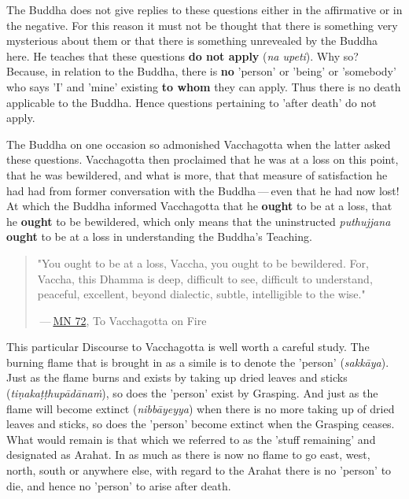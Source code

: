 The Buddha does not give replies to these questions either in the
affirmative or in the negative. For this reason it must not be thought
that there is something very mysterious about them or that there is
something unrevealed by the Buddha here. He teaches that these questions
\textbf{do not apply} (\emph{na upeti}). Why so? Because, in relation to the
Buddha, there is \textbf{no} 'person' or 'being' or 'somebody' who says 'I' and
'mine' existing \textbf{to whom} they can apply. Thus there is no death
applicable to the Buddha. Hence questions pertaining to 'after death' do
not apply.


The Buddha on one occasion so admonished Vacchagotta when the latter
asked these questions. Vacchagotta then proclaimed that he was at a loss
on this point, that he was bewildered, and what is more, that that
measure of satisfaction he had had from former conversation with the
Buddha — even that he had now lost! At which the Buddha informed
Vacchagotta that he \textbf{ought} to be at a loss, that he \textbf{ought} to be
bewildered, which only means that the uninstructed \emph{puthujjana} \textbf{ought}
to be at a loss in understanding the Buddha’s Teaching.


\begin{quotation}
"You ought to be at a loss, Vaccha, you ought to be bewildered. For,
Vaccha, this Dhamma is deep, difficult to see, difficult to understand,
peaceful, excellent, beyond dialectic, subtle, intelligible to the wise."


 — \href{https://suttacentral.net/mn72/en/thanissaro}{MN 72}, To Vacchagotta on Fire


\end{quotation}

This particular Discourse to Vacchagotta is well worth a careful study.
The burning flame that is brought in as a simile is to denote the
'person' (\emph{sakkāya}). Just as the flame burns and exists by taking up
dried leaves and sticks (\emph{tiṇakaṭṭhupādānaṁ}), so does the 'person'
exist by Grasping. And just as the flame will become extinct
(\emph{nibbāyeyya}) when there is no more taking up of dried leaves and
sticks, so does the 'person' become extinct when the Grasping ceases.
What would remain is that which we referred to as the 'stuff remaining'
and designated as Arahat. In as much as there is now no flame to go
east, west, north, south or anywhere else, with regard to the Arahat
there is no 'person' to die, and hence no 'person' to arise after death.


